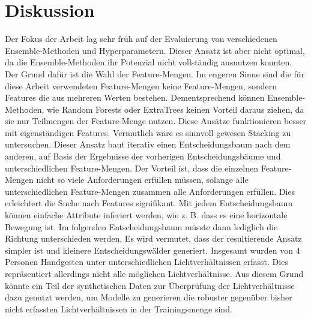 \chapter{Diskussion}
Der Fokus der Arbeit lag sehr früh auf der Evaluierung von verschiedenen Ensemble-Methoden und Hyperparametern. Dieser Ansatz ist aber nicht optimal, da die Ensemble-Methoden ihr Potenzial nicht vollständig
ausnutzen konnten. Der Grund dafür ist die Wahl der Feature-Mengen. Im engeren Sinne sind die für diese Arbeit verwendeten Feature-Mengen keine Feature-Mengen, sondern Features die aus mehreren Werten
bestehen. Dementsprechend können Ensemble-Methoden, wie Random Forests oder ExtraTrees keinen Vorteil daraus ziehen, da sie nur Teilmengen der Feature-Menge nutzen.
Diese Ansätze funktionieren besser mit eigenständigen Features.
\newline
\newline
Vermutlich wäre es sinnvoll gewesen Stacking zu untersuchen. Dieser Ansatz baut iterativ einen Entscheidungsbaum nach dem anderen, auf Basis der Ergebnisse der vorherigen Entscheidungsbäume und
unterschiedlichen Feature-Mengen. Der Vorteil ist, dass die einzelnen Feature-Mengen nicht so viele Anforderungen erfüllen müssen, solange alle unterschiedlichen Feature-Mengen zusammen alle
Anforderungen erfüllen. Dies erleichtert die Suche nach Features signifikant. Mit jedem Entscheidungsbaum können einfache Attribute inferiert werden, wie z. B. dass es eine horizontale Bewegung ist.
Im folgenden Entscheidungsbaum müsste dann lediglich die Richtung unterschieden werden. Es wird vermutet, dass der resultierende Ansatz simpler ist und kleinere Entscheidungswälder generiert.
\newline
\newline
Insgesamt wurden von 4 Personen Handgesten unter unterschiedlichen Lichtverhältnissen erfasst. Dies repräsentiert allerdings nicht alle möglichen Lichtverhältnisse. Aus diesem Grund könnte ein
Teil der synthetischen Daten zur Überprüfung der Lichtverhältnisse dazu genutzt werden, um Modelle zu generieren die robuster gegenüber bisher nicht erfassten Lichtverhältnissen in der Trainingsmenge sind.